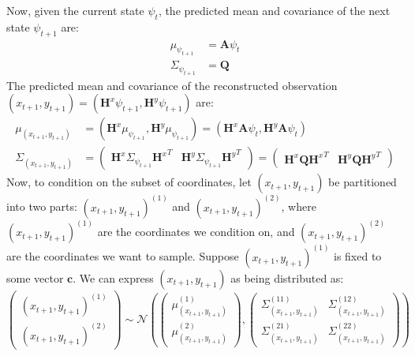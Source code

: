 \documentclass[11pt]{article}
\theoremstyle{plain}
\theoremstyle{definition}
\theoremstyle{remark}
\numberwithin{equation}{section}
\begin{document}
Now, given the current state $\psi_t$, the predicted mean and covariance of the next state $\psi_{t+1}$ are:
\begin{align*}
\mu_{\psi_{t+1}} &= \mathbf{A} \psi_t\\
\Sigma_{\psi_{t+1}} &= \mathbf{Q}
\end{align*}
The predicted mean and covariance of the reconstructed observation $(x_{t+1}, y_{t+1}) = (\mathbf{H}^x \psi_{t+1}, \mathbf{H}^y \psi_{t+1})$ are:
\begin{align*}\mu_{(x_{t+1}, y_{t+1})} &= (\mathbf{H}^x \mu_{\psi_{t+1}}, \mathbf{H}^y \mu_{\psi_{t+1}})= (\mathbf{H}^x \mathbf{A} \psi_t, \mathbf{H}^y \mathbf{A} \psi_t)\\
\Sigma_{(x_{t+1}, y_{t+1})} &= \begin{pmatrix} \mathbf{H}^x \Sigma_{\psi_{t+1}} {\mathbf{H}^x}^T & \mathbf{H}^y \Sigma_{\psi_{t+1}} {\mathbf{H}^y}^T \end{pmatrix} = \begin{pmatrix} \mathbf{H}^x \mathbf{Q} {\mathbf{H}^x}^T & \mathbf{H}^y \mathbf{Q} {\mathbf{H}^y}^T \end{pmatrix}
\end{align*}
\newline
Now, to condition on the subset of coordinates, let $(x_{t+1}, y_{t+1})$ be partitioned into two parts: $(x_{t+1}, y_{t+1})^{(1)}$ and $(x_{t+1}, y_{t+1})^{(2)}$, where $(x_{t+1}, y_{t+1})^{(1)}$ are the coordinates we condition on, and $(x_{t+1}, y_{t+1})^{(2)}$ are the coordinates we want to sample. Suppose $(x_{t+1}, y_{t+1})^{(1)}$ is fixed to some vector $\mathbf{c}$. We can express $(x_{t+1}, y_{t+1})$ as being distributed as:
\[
   \begin{pmatrix}
   (x_{t+1}, y_{t+1})^{(1)} \\
   (x_{t+1}, y_{t+1})^{(2)}
   \end{pmatrix}
   \sim \mathcal{N}\left(
   \begin{pmatrix}
   \mu_{(x_{t+1}, y_{t+1})}^{(1)} \\
   \mu_{(x_{t+1}, y_{t+1})}^{(2)}
   \end{pmatrix},
   \begin{pmatrix}
   \Sigma_{(x_{t+1}, y_{t+1})}^{(11)} & \Sigma_{(x_{t+1}, y_{t+1})}^{(12)} \\
   \Sigma_{(x_{t+1}, y_{t+1})}^{(21)} & \Sigma_{(x_{t+1}, y_{t+1})}^{(22)}
   \end{pmatrix}
   \right)
   \]
\end{document}
